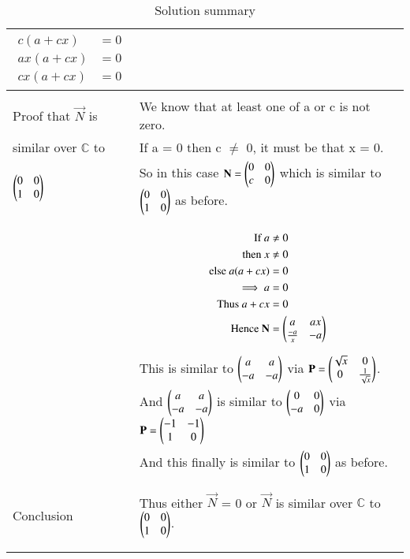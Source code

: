 \begin{longtable}{|l|l|}
{\begin{align}
c(a+cx)&=0\\
ax(a+cx)&=0\\
cx(a+cx)&=0
\end{align}}\\
\hline
&\\
Proof that $\vec{N}$ is&We know that at least one of a or c is not zero.\\
similar over $\mathbb{C}$ to&If a = 0 then c $\neq$ 0, it must be that x = 0.\\
$\begin{pmatrix}0&0\\1&0\end{pmatrix}$&So in this case $\mathbf{N}=\begin{pmatrix}0&0\\c&0\end{pmatrix}$ which is similar to $\begin{pmatrix}0&0\\1&0\end{pmatrix}$ as before.\\
&\\
&\parbox{6cm}{\begin{align}
\mbox{If } a &\neq0\\
\mbox{then }x &\neq0\\
\mbox{else }a(a+cx)&=0\\
\implies a&=0\\
\mbox{Thus }a+cx&=0\\
\mbox{Hence }\mathbf{N}&=\begin{pmatrix}a&ax\\ \frac{-a}{x}&-a\end{pmatrix}
\end{align}}\\
 &This is similar to $\begin{pmatrix}a&a\\-a&-a\end{pmatrix}$ via $\mathbf{P}=\begin{pmatrix}\sqrt{x}&0\\0&\frac{1}{\sqrt{x}}\end{pmatrix}$.\\
 &And $\begin{pmatrix}a&a\\-a&-a\end{pmatrix}$ is similar to $\begin{pmatrix}0&0\\-a&0\end{pmatrix}$ via $\mathbf{P}=\begin{pmatrix}-1&-1\\1&0\end{pmatrix}$\\
 &And this finally is similar to $\begin{pmatrix}0&0\\1&0\end{pmatrix}$ as before.\\
 &\\
\hline
&\\
Conclusion &Thus either $\vec{N}$ = 0 or $\vec{N}$ is similar over $\mathbb{C}$ to $\begin{pmatrix}0&0\\1&0\end{pmatrix}$.\\
&\\
\hline
\caption{Solution summary}
\label{eq:solutions/6/2/11/table:1}
\end{longtable}

